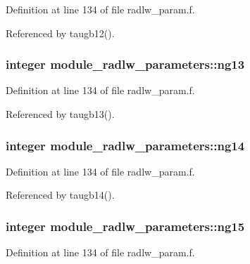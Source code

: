 Definition at line 134 of file radlw\+\_\+param.\+f.



Referenced by taugb12().

\subsubsection[{\texorpdfstring{ng13}{ng13}}]{\setlength{\rightskip}{0pt plus 5cm}integer module\+\_\+radlw\+\_\+parameters\+::ng13}\hypertarget{group__module__radlw__main_ga30e06652ca51875c17e56138eade5add}{}\label{group__module__radlw__main_ga30e06652ca51875c17e56138eade5add}


Definition at line 134 of file radlw\+\_\+param.\+f.



Referenced by taugb13().

\subsubsection[{\texorpdfstring{ng14}{ng14}}]{\setlength{\rightskip}{0pt plus 5cm}integer module\+\_\+radlw\+\_\+parameters\+::ng14}\hypertarget{group__module__radlw__main_ga32a603592af43d9de953c983a4e2f8c8}{}\label{group__module__radlw__main_ga32a603592af43d9de953c983a4e2f8c8}


Definition at line 134 of file radlw\+\_\+param.\+f.



Referenced by taugb14().

\subsubsection[{\texorpdfstring{ng15}{ng15}}]{\setlength{\rightskip}{0pt plus 5cm}integer module\+\_\+radlw\+\_\+parameters\+::ng15}\hypertarget{group__module__radlw__main_ga1401bb43dbe665c21a17276cd82f4859}{}\label{group__module__radlw__main_ga1401bb43dbe665c21a17276cd82f4859}


Definition at line 134 of file radlw\+\_\+param.\+f.



